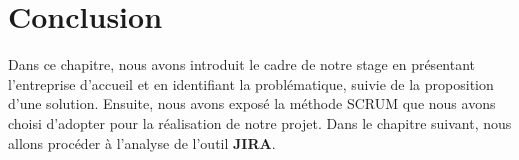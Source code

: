 \begin{sloppypar}
\vspace{-7mm}

\section{Conclusion }
\vspace{-4mm}
Dans ce chapitre, nous avons introduit le cadre de notre stage en présentant l'entreprise d'accueil et en identifiant la problématique, suivie de la proposition d'une solution. Ensuite, nous avons exposé la méthode SCRUM que nous avons choisi d'adopter pour la réalisation de notre projet. Dans le chapitre suivant, nous allons procéder à l'analyse de l'outil \textbf{JIRA}.
    


\end{sloppypar}


 